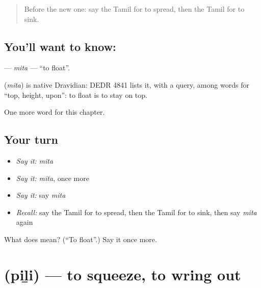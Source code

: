 \label{lesson:TA-C260-mita}



\begin{quote}
Before the new one: say the Tamil for to spread, then the Tamil for to sink.
\end{quote}

\subsection*{You'll want to know: }
\textbf{} — \emph{mita} — \textquotedblleft{}to float\textquotedblright{}.

\begin{cousinweb}
\textbf{} (\emph{mita}) is native Dravidian: DEDR 4841 lists it, with a query, among words for \textquotedblleft{}top, height, upon\textquotedblright{}: to float is to stay on top.
\end{cousinweb}

\begin{grammarlens}[title={What you've built}]
One more word for this chapter.
\end{grammarlens}

\subsection*{Your turn}
\begin{itemize}
\raggedright
  \item \emph{Say it:} \emph{mita}
  \item \emph{Say it:} \emph{mita}, once more
  \item \emph{Say it:} say \emph{mita}
  \item \emph{Recall:} say the Tamil for to spread, then the Tamil for to sink, then say \emph{mita} again
\end{itemize}

\begin{tcolorbox}[breakable,colback=teal!4,colframe=teal!35!black,title={Before you move on}]
What does  mean? (\textquotedblleft{}To float\textquotedblright{}.) Say it once more.
\end{tcolorbox}
\section[\texorpdfstring{\ta{பிழி} (piḻi)}{பிழி (piḻi)}]{ (piḻi) — to squeeze, to wring out}

\label{lesson:TA-C260-pili}



